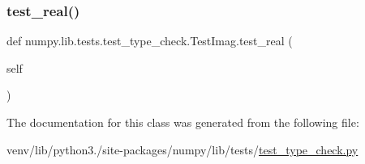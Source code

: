\subsubsection{\texorpdfstring{test\+\_\+real()}{test\_real()}}
{\footnotesize\ttfamily def numpy.\+lib.\+tests.\+test\+\_\+type\+\_\+check.\+Test\+Imag.\+test\+\_\+real (\begin{DoxyParamCaption}\item[{}]{self }\end{DoxyParamCaption})}



The documentation for this class was generated from the following file\+:\begin{DoxyCompactItemize}
\item 
venv/lib/python3./site-\/packages/numpy/lib/tests/\hyperlink{test__type__check_8py}{test\+\_\+type\+\_\+check.\+py}\end{DoxyCompactItemize}
